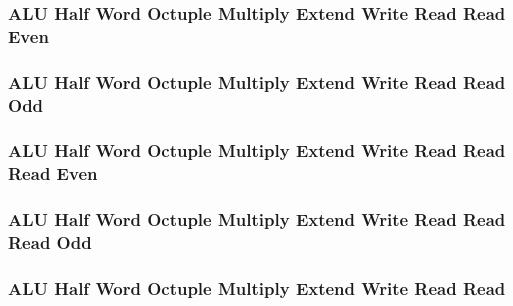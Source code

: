 

\subsubsection[{\small ALU Half Word Octuple Multiply Extend Write Read Read Even}]{ALU Half Word Octuple Multiply Extend Write Read Read Even} \label{sec:format-ALU-HOMEWRRE}



\subsubsection[{\small ALU Half Word Octuple Multiply Extend Write Read Read Odd}]{ALU Half Word Octuple Multiply Extend Write Read Read Odd} \label{sec:format-ALU-HOMEWRRO}



\subsubsection[{\small ALU Half Word Octuple Multiply Extend Write Read Read Read Even}]{ALU Half Word Octuple Multiply Extend Write Read Read Read Even} \label{sec:format-ALU-HOMEWRRRE}



\subsubsection[{\small ALU Half Word Octuple Multiply Extend Write Read Read Read Odd}]{ALU Half Word Octuple Multiply Extend Write Read Read Read Odd} \label{sec:format-ALU-HOMEWRRRO}



\subsubsection[{\small ALU Half Word Octuple Multiply Extend Write Read Read}]{ALU Half Word Octuple Multiply Extend Write Read Read} \label{sec:format-ALU-HOMXWRR}

